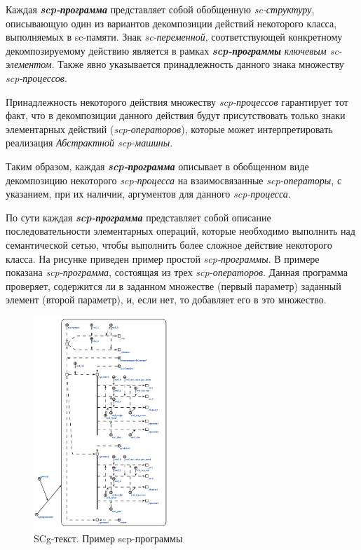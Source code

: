 \newpage
Каждая \textbf{\textit{scp-программа}} представляет собой обобщенную \textit{sc-структуру}, описывающую один из вариантов декомпозиции действий некоторого класса, выполняемых в sc-памяти. Знак \textit{sc-переменной}, соответствующей конкретному декомпозируемому действию является в рамках \textbf{\textit{scp-программы}} \textit{ключевым sc-элементом\scnrolesign}. Также явно указывается принадлежность данного знака множеству \textit{scp-процессов}.
	
Принадлежность некоторого действия множеству \textit{scp-процессов} гарантирует тот факт, что в декомпозиции данного действия будут присутствовать только знаки элементарных действий (\textit{scp-операторов}), которые может интерпретировать реализация \textit{Абстрактной scp-машины}.

Таким образом, каждая \textbf{\textit{scp-программа}} описывает в обобщенном виде декомпозицию некоторого \textit{\mbox{scp-процесса}} на взаимосвязанные \textit{scp-операторы}, с указанием, при их наличии, аргументов для данного \textit{scp-процесса}.

По сути каждая \textbf{\textit{scp-программа}} представляет собой описание последовательности элементарных операций, которые необходимо выполнить над семантической сетью, чтобы выполнить более сложное действие некоторого класса.
На рисунке приведен пример простой \textit{scp-программы}. В примере показана \textit{scp-программа}, состоящая из трех \textit{scp-операторов}. Данная программа проверяет, содержится ли в заданном множестве (первый параметр) заданный элемент (второй параметр), и, если нет, то добавляет его в это множество.

\begin{frame}{}
\begin{figure}[H]
    \caption{SCg-текст. Пример scp-программы}
	\includegraphics[width=0.9\linewidth, height=8cm]{figures/sc-agents/program_example.png}
\end{figure}
\end{frame}

